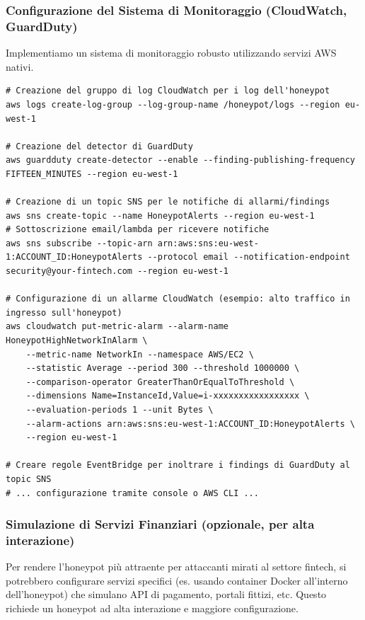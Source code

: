 \documentclass[a4paper,12pt]{report}
\begin{document}
\subsubsection{Configurazione del Sistema di Monitoraggio (CloudWatch, GuardDuty)}
\label{subsubsec:config_monitoraggio}

Implementiamo un sistema di monitoraggio robusto utilizzando servizi AWS nativi.

\begin{lstlisting}[caption={Configurazione (esemplificativa) del monitoraggio AWS}, label=lst:monitoring_setup]
# Creazione del gruppo di log CloudWatch per i log dell'honeypot
aws logs create-log-group --log-group-name /honeypot/logs --region eu-west-1

# Creazione del detector di GuardDuty
aws guardduty create-detector --enable --finding-publishing-frequency FIFTEEN_MINUTES --region eu-west-1

# Creazione di un topic SNS per le notifiche di allarmi/findings
aws sns create-topic --name HoneypotAlerts --region eu-west-1
# Sottoscrizione email/lambda per ricevere notifiche
aws sns subscribe --topic-arn arn:aws:sns:eu-west-1:ACCOUNT_ID:HoneypotAlerts --protocol email --notification-endpoint security@your-fintech.com --region eu-west-1

# Configurazione di un allarme CloudWatch (esempio: alto traffico in ingresso sull'honeypot)
aws cloudwatch put-metric-alarm --alarm-name HoneypotHighNetworkInAlarm \
    --metric-name NetworkIn --namespace AWS/EC2 \
    --statistic Average --period 300 --threshold 1000000 \
    --comparison-operator GreaterThanOrEqualToThreshold \
    --dimensions Name=InstanceId,Value=i-xxxxxxxxxxxxxxxxx \
    --evaluation-periods 1 --unit Bytes \
    --alarm-actions arn:aws:sns:eu-west-1:ACCOUNT_ID:HoneypotAlerts \
    --region eu-west-1

# Creare regole EventBridge per inoltrare i findings di GuardDuty al topic SNS
# ... configurazione tramite console o AWS CLI ...
\end{lstlisting}

\subsubsection{Simulazione di Servizi Finanziari (opzionale, per alta interazione)}
\label{subsubsec:sim_servizi}

Per rendere l'honeypot più attraente per attaccanti mirati al settore fintech, si potrebbero configurare servizi specifici (es. usando container Docker all'interno dell'honeypot) che simulano API di pagamento, portali fittizi, etc. Questo richiede un honeypot ad alta interazione e maggiore configurazione.
\end{document}
